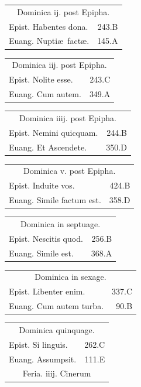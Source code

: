\documentclass[a5paper,10pt]{book}
\def\ae{æ}
\begin{document}
\begin{multicols*}{2}
\begin{tabular}{l r}
\multicolumn{2}{c}{\color{red} Dominica ij. post Epipha.}\\
Epist. Habentes dona. & 243.B\\
Euang. Nupti\ae \ fact\ae . & 145.A\\
\end{tabular}
\begin{tabular}{l r}
\multicolumn{2}{c}{\color{red} Dominica iij. post Epipha.}\\
Epist. Nolite esse. & 243.C\\
Euang. Cum autem. & 349.A\\
\end{tabular}
\begin{tabular}{l r}
\multicolumn{2}{c}{\color{red} Dominica iiij. post Epipha.}\\
Epist. Nemini quicquam. & 244.B\\%
Euang. Et Ascendete. & 350.D\\
\end{tabular}
\begin{tabular}{l r}
\multicolumn{2}{c}{\color{red} Dominica v. post Epipha.}\\
Epist. Induite vos. & 424.B\\
Euang. Simile factum est. & 358.D\\
\end{tabular}
\begin{tabular}{l r}
\multicolumn{2}{c}{\color{red} Dominica in septuage.}\\
Epist. Nescitis quod. & 256.B\\
Euang. Simile est. & 368.A\\
\end{tabular}
\begin{tabular}{l r}
\multicolumn{2}{c}{\color{red} Dominica in sexage.}\\
Epist. Libenter enim. & 337.C\\
Euang. Cum autem turba. & 90.B\\
\end{tabular}
\begin{tabular}{l r}
\multicolumn{2}{c}{\color{red} Dominica quinquage.}\\
Epist. Si linguis. & 262.C\\
Euang. Assumpsit. & 111.E\\
\multicolumn{2}{c}{\color{red} Feria. iiij. Cinerum}\\

\end{tabular}
\end{multicols*}
\end{document}
